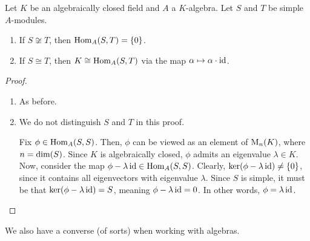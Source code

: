 \begin{theorem}\label{Ch1:Thm:Schur_Algebra}
    Let $K$ be an algebraically closed field and $A$ a $K$-algebra. Let $S$ and $T$ be simple $A$-modules.
    \begin{enumerate}[label = \normalfont \arabic*., noitemsep]
        \item If $S \not\cong T$, then $\operatorname{Hom}_A(S, T) = \left\{ 0 \right\}$.
        \item If $S \cong T$, then $K \cong \operatorname{Hom}_A(S, T)$ via the map $\alpha \mapsto \alpha \cdot \operatorname{id}$.
    \end{enumerate}
\end{theorem}
\begin{proof}
    \hfill
    \begin{enumerate}
        \item As before.
        \item We do not distinguish $S$ and $T$ in this proof.
        
        Fix $\phi \in \operatorname{Hom}_A(S,S)$. Then, $\phi$ can be viewed as an element of $\operatorname{M}_{n}\!\left( K \right)$, where $n = \dim\!\left( S \right)$. Since $K$ is algebraically closed, $\phi$ admits an eigenvalue $\lambda \in K$. Now, consider the map $\phi - \lambda \operatorname{id} \in \operatorname{Hom}_A(S,S)$. Clearly, $\operatorname{ker}\!\left( \phi - \lambda \operatorname{id} \right) \neq \left\{ 0 \right\}$, since it contains all eigenvectors with eigenvalue $\lambda$. Since $S$ is simple, it must be that $\operatorname{ker}\!\left( \phi - \lambda \operatorname{id} \right) = S$, meaning $\phi - \lambda \operatorname{id} = 0$. In other words, $\phi = \lambda \operatorname{id}$.  %
    \end{enumerate}
\end{proof}

We also have a converse (of sorts) when working with algebras.

